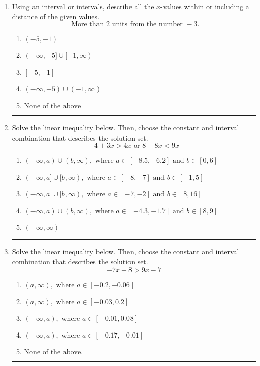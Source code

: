 \documentclass[14pt]{extbook}
\newcommand{\litem}[1]{\item#1\hspace*{-1cm}\rule{\textwidth}{0.4pt}}
\begin{document}
\begin{enumerate}
{\begin{enumerate}[label=\Alph*.]
\end{enumerate} }
\litem{
Using an interval or intervals, describe all the $x$-values within or including a distance of the given values.\[ \text{ More than } 2 \text{ units from the number } -3. \]\begin{enumerate}[label=\Alph*.]
\item \( (-5, -1) \)
\item \( (-\infty, -5] \cup [-1, \infty) \)
\item \( [-5, -1] \)
\item \( (-\infty, -5) \cup (-1, \infty) \)
\item \( \text{None of the above} \)

\end{enumerate} }
\litem{
Solve the linear inequality below. Then, choose the constant and interval combination that describes the solution set.\[ -4 + 3 x > 4 x \text{ or } 8 + 8 x < 9 x \]\begin{enumerate}[label=\Alph*.]
\item \( (-\infty, a) \cup (b, \infty), \text{ where } a \in [-8.5, -6.2] \text{ and } b \in [0, 6] \)
\item \( (-\infty, a] \cup [b, \infty), \text{ where } a \in [-8, -7] \text{ and } b \in [-1, 5] \)
\item \( (-\infty, a] \cup [b, \infty), \text{ where } a \in [-7, -2] \text{ and } b \in [8, 16] \)
\item \( (-\infty, a) \cup (b, \infty), \text{ where } a \in [-4.3, -1.7] \text{ and } b \in [8, 9] \)
\item \( (-\infty, \infty) \)

\end{enumerate} }
\litem{
Solve the linear inequality below. Then, choose the constant and interval combination that describes the solution set.\[ -7x -8 > 9x -7 \]\begin{enumerate}[label=\Alph*.]
\item \( (a, \infty), \text{ where } a \in [-0.2, -0.06] \)
\item \( (a, \infty), \text{ where } a \in [-0.03, 0.2] \)
\item \( (-\infty, a), \text{ where } a \in [-0.01, 0.08] \)
\item \( (-\infty, a), \text{ where } a \in [-0.17, -0.01] \)
\item \( \text{None of the above}. \)


\end{enumerate}}
\end{enumerate}
\end{document}
